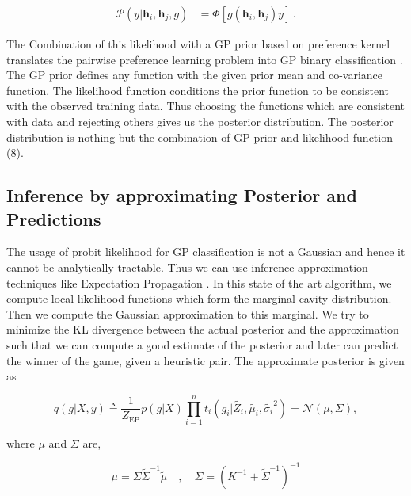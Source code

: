 \documentclass{scrartcl}
\begin{document}
	\vspace{-0.65cm}
{\small
{\small
\begin{align}
\mathcal{P}(y|\mathbf{h}_i,\mathbf{h}_j,g) &= \Phi[g(\mathbf{h}_i, \mathbf{h}_j)y]\,.\label{eq:likelihood2}
\end{align}
}

\vspace{-0.7cm}

\hfill 
\normalsize

The Combination of this likelihood with a GP prior based on preference kernel translates the pairwise preference learning problem into GP binary classification \cite{houlsby2012collaborative}. The GP prior defines any function with the given prior mean and co-variance function. The likelihood function conditions the prior function to be consistent with the observed training data. Thus choosing the functions which are consistent with data and rejecting others gives us the posterior distribution. The posterior distribution is nothing but the combination of GP prior and likelihood function (8).

\newpage

\subsection {Inference by approximating Posterior and Predictions}
 The usage of probit likelihood for GP classification is not a Gaussian and hence it cannot be analytically tractable. Thus we can use inference approximation techniques like Expectation Propagation \cite{rasmussen2006gaussian}. In this state of the art algorithm, we compute local likelihood functions which form the marginal cavity distribution. Then we compute the Gaussian approximation to this marginal. We try to minimize the KL divergence between the actual posterior and the approximation such that we can compute a good estimate of the posterior and later can predict the winner of the game, given a heuristic pair. The approximate posterior is given as


\begin{equation}
q(g|X,y) \triangleq \frac {1}{Z_\text{EP}}p(g|X) \prod_{i=1}^{n}t_i(g_i|\widetilde{Z_i},\widetilde{\mu_i},\widetilde{\sigma_i}^{2}) = \mathcal{N}(\mu,\Sigma),
\end{equation}

where $\mu$ and $\Sigma$ are,


\begin{equation}
\mu = \Sigma\widetilde{\Sigma}^{-1}\widetilde{\mu} \quad , \quad \Sigma = (K^{-1} + \widetilde{\Sigma}^{-1})^{-1}
\end{equation}

}
\end{document}
